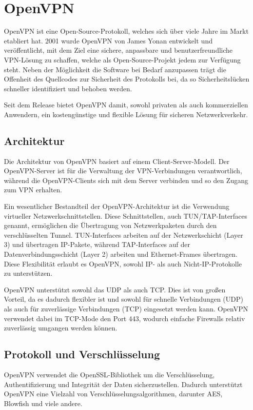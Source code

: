 \section{OpenVPN} \label{openvpn}
OpenVPN ist eine Open-Source-Protokoll, welches sich über viele Jahre im Markt etabliert hat. 2001 wurde OpenVPN von James Yonan entwickelt und veröffentlicht, mit dem Ziel eine sichere, anpassbare und benutzerfreundliche \gls{VPN}-Lösung zu schaffen, welche als Open-Source-Projekt jedem zur Verfügung steht. Neben der Möglichkeit die Software bei Bedarf anzupassen trägt die Offenheit des Quellcodes zur Sicherheit des Protokolls bei, da so Sicherheitslücken schneller identifiziert und behoben werden.

Seit dem Release bietet OpenVPN damit, sowohl privaten als auch kommerziellen Anwendern, ein kostengünstige und flexible Lösung für sicheren Netzwerkverkehr.

\subsection{Architektur}
Die Architektur von OpenVPN basiert auf einem Client-Server-Modell. Der OpenVPN-Server ist für die Verwaltung der \gls{VPN}-Verbindungen verantwortlich, während die OpenVPN-Clients sich mit dem Server verbinden und so den Zugang zum \gls{VPN} erhalten.

Ein wesentlicher Bestandteil der OpenVPN-Architektur ist die Verwendung virtueller Netzwerkschnittstellen. Diese Schnittstellen, auch TUN/TAP-Interfaces genannt, ermöglichen die Übertragung von Netzwerkpaketen durch den verschlüsselten Tunnel. TUN-Interfaces arbeiten auf der Netzwerkschicht (Layer 3) und übertragen \gls{IP}-Pakete, während TAP-Interfaces auf der Datenverbindungsschicht (Layer 2) arbeiten und Ethernet-Frames übertragen. Diese Flexibilität erlaubt es OpenVPN, sowohl \gls{IP}- als auch Nicht-\gls{IP}-Protokolle zu unterstützen.

OpenVPN unterstützt sowohl das \gls{UDP} als auch \gls{TCP}. Dies ist von großen Vorteil, da es dadurch flexibler ist und sowohl für schnelle Verbindungen (\gls{UDP}) als auch für zuverlässige Verbindungen (\gls{TCP}) eingesetzt werden kann. OpenVPN verwendet dabei im \gls{TCP}-Mode den Port 443, wodurch einfache Firewalls relativ zuverlässig umgangen werden können. 

\subsection{Protokoll und Verschlüsselung}
OpenVPN verwendet die OpenSSL-Bibliothek um die Verschlüsselung, Authentifizierung und Integrität der Daten sicherzustellen. Dadurch unterstützt OpenVPN eine Vielzahl von Verschlüsselungsalgorithmen, darunter \gls{AES}, Blowfish und viele andere.

